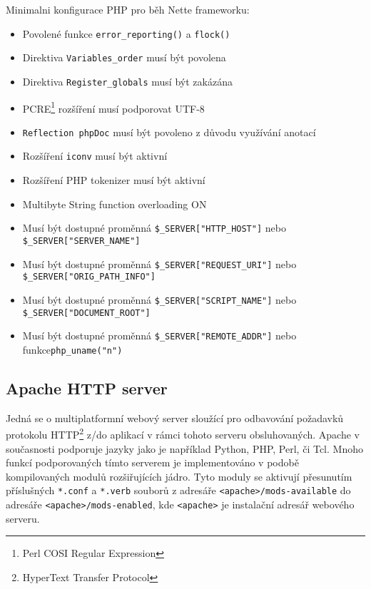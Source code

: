 \documentclass[11pt,oneside]{fithesis}
\begin{document}
        Minimalni konfigurace PHP pro běh Nette frameworku:
        \begin{itemize}
            \item Povolené funkce \verb|error_reporting()| a \verb|flock()|
            \item Direktiva \verb|Variables_order| musí být povolena
            \item Direktiva \verb|Register_globals| musí být zakázána
            \item PCRE\footnote{Perl COSI Regular Expression} rozšíření musí podporovat UTF-8
            \item \verb|Reflection phpDoc| musí být povoleno z důvodu využívání anotací
            \item Rozšíření \verb|iconv| musí být aktivní
            \item Rozšíření PHP tokenizer musí být aktivní
            \item Multibyte String function overloading ON
            \item Musí být dostupné proměnná \verb|$_SERVER["HTTP_HOST"]| nebo\\ \verb|$_SERVER["SERVER_NAME"]|
            \item Musí být dostupné proměnná \verb|$_SERVER["REQUEST_URI"]| nebo \verb|$_SERVER["ORIG_PATH_INFO"]|
            \item Musí být dostupné proměnná \verb|$_SERVER["SCRIPT_NAME"]| nebo \verb|$_SERVER["DOCUMENT_ROOT"]|
            \item Musí být dostupné proměnná \verb|$_SERVER["REMOTE_ADDR"]| nebo funkce\verb|php_uname("n")|
        \end{itemize}

        \subsection{Apache HTTP server}
        Jedná se o multiplatformní webový server sloužící pro odbavování požadavků protokolu HTTP\footnote{HyperText Transfer Protocol} z/do aplikací v rámci tohoto serveru obsluhovaných. Apache v současnosti podporuje jazyky jako je například Python, PHP, Perl, či Tcl. Mnoho funkcí podporovaných tímto serverem je implementováno v podobě kompilovaných modulů rozšiřujících jádro. 
        Tyto moduly se aktivují přesunutím příslušných \verb|*.conf| a \verb|*.verb| souborů z adresáře \verb|<apache>/mods-available| do adresáře \verb|<apache>/mods-enabled|, kde \verb|<apache>| je instalační adresář webového serveru.
\end{document}
